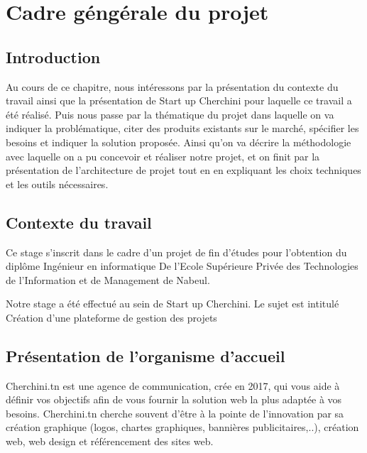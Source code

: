
\chapter{Cadre g\'{e}ng\'{e}rale du projet}

\section{Introduction}

 Au cours de ce chapitre, nous  int\'{e}ressons par la
pr\'{e}sentation du contexte du travail ainsi que la pr\'{e}sentation de Start up
Cherchini pour laquelle ce travail a \'{e}t\'{e} r\'{e}alis\'{e}.
Puis nous passe par la th\'{e}matique du projet dans laquelle on va indiquer la
probl\'{e}matique, citer des produits existants sur le march\'{e}, sp\'{e}cifier les besoins
et indiquer la solution propos\'{e}e. Ainsi qu'on va d\'{e}crire la m\'{e}thodologie avec
laquelle on a pu concevoir et r\'{e}aliser notre projet, et on finit par la
pr\'{e}sentation de l'architecture de projet tout en en expliquant les choix
techniques et les outils n\'{e}cessaires.

\section{Contexte du travail}

 Ce stage s'inscrit dans le cadre d'un projet de fin d'\'{e}tudes pour l'obtention du
dipl\^{o}me Ing\'{e}nieur en informatique De l'Ecole Sup\'{e}rieure Priv\'{e}e des
Technologies de l'Information et de Management de Nabeul.

 Notre stage a \'{e}t\'{e} effectu\'{e} au sein de Start up Cherchini.
Le sujet est intitul\'{e} \guillemotleft{}Cr\'{e}ation d'une plateforme de gestion des projets\guillemotright{}




\section{Pr\'{e}sentation  de l'organisme d'accueil}

\bigskip
 Cherchini.tn est une agence de communication, cr\'{e}e en 2017, qui vous aide \`{a}
d\'{e}finir vos objectifs afin de vous fournir la solution web la plus adapt\'{e}e \`{a} vos
besoins. Cherchini.tn cherche souvent d'\^{e}tre \`{a} la pointe de l'innovation par sa
cr\'{e}ation graphique (logos, chartes graphiques, banni\`{e}res publicitaires,..),
cr\'{e}ation web, web design et r\'{e}f\'{e}rencement des sites web.

